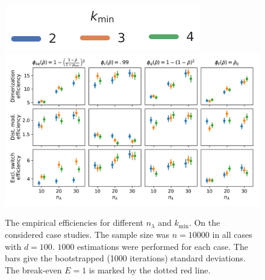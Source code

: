 \begin{figure}[htb]
    \centering    
    \includegraphics[scale=.55]{gfx/legend.pdf}\\
    \includegraphics[scale=.4]{gfx/efficiency_pminfrac.pdf}
	\caption[Influence of the redundancy heuristic and $k_{\min}$]{The empirical efficiencies for different $n_\lambda$ and $k_{\min}$.
	On the considered case studies. The sample size was $n=\num{10000}$ in all cases
    with $d=100$.
	$\num{1000}$ estimations were performed for each case.
    The bars give the 
	bootstrapped (\num{1000} iterations) standard deviations.
    The break-even $E=1$ is marked by the dotted red line.\label{fig:efficiencies_alg_params}}
\end{figure}



